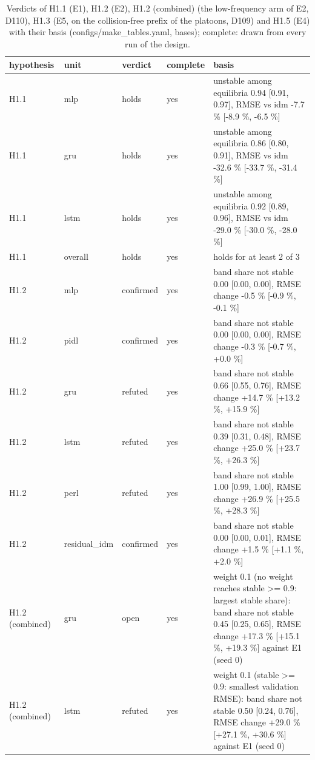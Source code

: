 \begin{table}[htbp]
\centering
\caption{Verdicts of H1.1 (E1), H1.2 (E2), H1.2 (combined) (the low-frequency arm of E2, D110), H1.3 (E5, on the collision-free prefix of the platoons, D109) and H1.5 (E4) with their basis (configs/make\_tables.yaml, bases); complete: drawn from every run of the design.}
\label{tab:verdicts}
\small
\begin{tabular}{lllll}
\toprule
hypothesis & unit & verdict & complete & basis \\
\midrule
H1.1 & mlp & holds & yes & unstable among equilibria 0.94 [0.91, 0.97], RMSE vs idm -7.7 \% [-8.9 \%, -6.5 \%] \\
H1.1 & gru & holds & yes & unstable among equilibria 0.86 [0.80, 0.91], RMSE vs idm -32.6 \% [-33.7 \%, -31.4 \%] \\
H1.1 & lstm & holds & yes & unstable among equilibria 0.92 [0.89, 0.96], RMSE vs idm -29.0 \% [-30.0 \%, -28.0 \%] \\
H1.1 & overall & holds & yes & holds for at least 2 of 3 \\
H1.2 & mlp & confirmed & yes & band share not stable 0.00 [0.00, 0.00], RMSE change -0.5 \% [-0.9 \%, -0.1 \%] \\
H1.2 & pidl & confirmed & yes & band share not stable 0.00 [0.00, 0.00], RMSE change -0.3 \% [-0.7 \%, +0.0 \%] \\
H1.2 & gru & refuted & yes & band share not stable 0.66 [0.55, 0.76], RMSE change +14.7 \% [+13.2 \%, +15.9 \%] \\
H1.2 & lstm & refuted & yes & band share not stable 0.39 [0.31, 0.48], RMSE change +25.0 \% [+23.7 \%, +26.3 \%] \\
H1.2 & perl & refuted & yes & band share not stable 1.00 [0.99, 1.00], RMSE change +26.9 \% [+25.5 \%, +28.3 \%] \\
H1.2 & residual\_idm & confirmed & yes & band share not stable 0.00 [0.00, 0.01], RMSE change +1.5 \% [+1.1 \%, +2.0 \%] \\
H1.2 (combined) & gru & open & yes & weight 0.1 (no weight reaches stable \textgreater{}= 0.9: largest stable share): band share not stable 0.45 [0.25, 0.65], RMSE change +17.3 \% [+15.1 \%, +19.3 \%] against E1 (seed 0) \\
H1.2 (combined) & lstm & refuted & yes & weight 0.1 (stable \textgreater{}= 0.9: smallest validation RMSE): band share not stable 0.50 [0.24, 0.76], RMSE change +29.0 \% [+27.1 \%, +30.6 \%] against E1 (seed 0) \\

\end{tabular}
\end{table}
